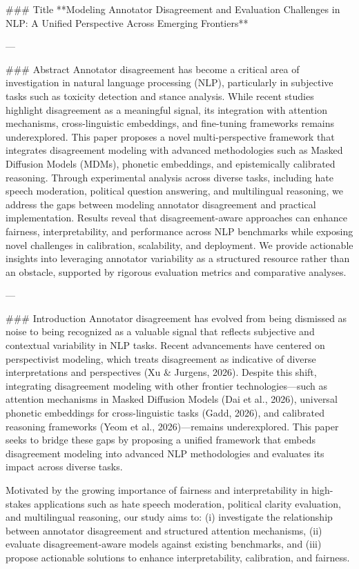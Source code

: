 ### Title  
**Modeling Annotator Disagreement and Evaluation Challenges in NLP: A Unified Perspective Across Emerging Frontiers**

---

### Abstract  
Annotator disagreement has become a critical area of investigation in natural language processing (NLP), particularly in subjective tasks such as toxicity detection and stance analysis. While recent studies highlight disagreement as a meaningful signal, its integration with attention mechanisms, cross-linguistic embeddings, and fine-tuning frameworks remains underexplored. This paper proposes a novel multi-perspective framework that integrates disagreement modeling with advanced methodologies such as Masked Diffusion Models (MDMs), phonetic embeddings, and epistemically calibrated reasoning. Through experimental analysis across diverse tasks, including hate speech moderation, political question answering, and multilingual reasoning, we address the gaps between modeling annotator disagreement and practical implementation. Results reveal that disagreement-aware approaches can enhance fairness, interpretability, and performance across NLP benchmarks while exposing novel challenges in calibration, scalability, and deployment. We provide actionable insights into leveraging annotator variability as a structured resource rather than an obstacle, supported by rigorous evaluation metrics and comparative analyses.

---

### Introduction  
Annotator disagreement has evolved from being dismissed as noise to being recognized as a valuable signal that reflects subjective and contextual variability in NLP tasks. Recent advancements have centered on perspectivist modeling, which treats disagreement as indicative of diverse interpretations and perspectives (Xu & Jurgens, 2026). Despite this shift, integrating disagreement modeling with other frontier technologies—such as attention mechanisms in Masked Diffusion Models (Dai et al., 2026), universal phonetic embeddings for cross-linguistic tasks (Gadd, 2026), and calibrated reasoning frameworks (Yeom et al., 2026)—remains underexplored. This paper seeks to bridge these gaps by proposing a unified framework that embeds disagreement modeling into advanced NLP methodologies and evaluates its impact across diverse tasks.  

Motivated by the growing importance of fairness and interpretability in high-stakes applications such as hate speech moderation, political clarity evaluation, and multilingual reasoning, our study aims to: (i) investigate the relationship between annotator disagreement and structured attention mechanisms, (ii) evaluate disagreement-aware models against existing benchmarks, and (iii) propose actionable solutions to enhance interpretability, calibration, and fairness.

